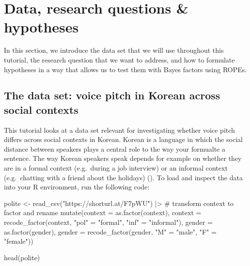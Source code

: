 \documentclass[
  doc,
  floatsintext,
  longtable,
  nolmodern,
  notxfonts,
  notimes,
  colorlinks=true,linkcolor=blue,citecolor=blue,urlcolor=blue]{apa7}
\newenvironment{Shaded}{\begin{snugshade}}{\end{snugshade}}
\newcommand{\AttributeTok}[1]{\textcolor[rgb]{0.40,0.45,0.13}{#1}}
\newcommand{\CommentTok}[1]{\textcolor[rgb]{0.37,0.37,0.37}{#1}}
\newcommand{\FunctionTok}[1]{\textcolor[rgb]{0.28,0.35,0.67}{#1}}
\newcommand{\NormalTok}[1]{\textcolor[rgb]{0.00,0.23,0.31}{#1}}
\newcommand{\OtherTok}[1]{\textcolor[rgb]{0.00,0.23,0.31}{#1}}
\newcommand{\SpecialCharTok}[1]{\textcolor[rgb]{0.37,0.37,0.37}{#1}}
\newcommand{\StringTok}[1]{\textcolor[rgb]{0.13,0.47,0.30}{#1}}
\begin{document}
\section{Data, research questions \&
hypotheses}\label{data-research-questions-hypotheses}

In this section, we introduce the data set that we will use throughout
this tutorial, the research question that we want to address, and how to
formulate hypotheses in a way that allows us to test them with Bayes
factors using ROPEs.

\subsection{The data set: voice pitch in Korean across social
contexts}\label{the-data-set-voice-pitch-in-korean-across-social-contexts}

This tutorial looks at a data set relevant for investigating whether
voice pitch diﬀers across social contexts in Korean. Korean is a
language in which the social distance between speakers plays a central
role to the way your formualte a sentence. The way Korean speakers speak
depends for example on whether they are in a formal context (e.g.~during
a job interview) or an informal context (e.g.~chatting with a friend
about the holidays)
(). To load and inspect the data into your R environment,
run the following code:

\begin{Shaded}
\begin{Highlighting}[]
\NormalTok{polite }\OtherTok{\textless{}{-}} 
  \FunctionTok{read\_csv}\NormalTok{(}\StringTok{"https://shorturl.at/F7pWU"}\NormalTok{) }\SpecialCharTok{|\textgreater{}} 
  \CommentTok{\# transform context to factor and rename}
  \FunctionTok{mutate}\NormalTok{(}\AttributeTok{context =} \FunctionTok{as.factor}\NormalTok{(context),}
         \AttributeTok{context =} \FunctionTok{recode\_factor}\NormalTok{(context,}
                                 \StringTok{"pol"} \OtherTok{=} \StringTok{"formal"}\NormalTok{,}
                                 \StringTok{"inf"} \OtherTok{=} \StringTok{"informal"}\NormalTok{),}
         \AttributeTok{gender =} \FunctionTok{as.factor}\NormalTok{(gender),}
         \AttributeTok{gender =} \FunctionTok{recode\_factor}\NormalTok{(gender,}
                                \StringTok{"M"} \OtherTok{=} \StringTok{"male"}\NormalTok{,}
                                \StringTok{"F"} \OtherTok{=} \StringTok{"female"}\NormalTok{))}

\FunctionTok{head}\NormalTok{(polite)}
\end{Highlighting}
\end{Shaded}
\end{document}
